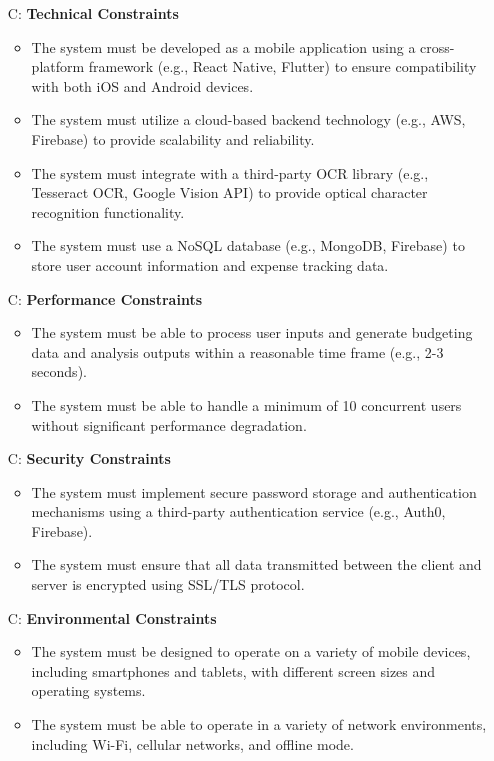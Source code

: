 \documentclass[12pt]{article}
\newcounter{constraintnum} %
\begin{document}
\begin{itemize}
  \item [C\refstepcounter{constraintnum}\theconstraintnum :] \textbf{Technical Constraints}
    \begin{itemize}
      \item The system must be developed as a mobile application using a cross-platform framework (e.g., React Native, Flutter) to ensure compatibility with both iOS and Android devices.
      \item The system must utilize a cloud-based backend technology (e.g., AWS, Firebase) to provide scalability and reliability.
      \item The system must integrate with a third-party OCR library (e.g., Tesseract OCR, Google Vision API) to provide optical character recognition functionality.
      \item The system must use a NoSQL database (e.g., MongoDB, Firebase) to store user account information and expense tracking data.
    \end{itemize}

  \item [C\refstepcounter{constraintnum}\theconstraintnum :] \textbf{Performance Constraints} 
    \begin{itemize}
      \item The system must be able to process user inputs and generate budgeting data and analysis outputs within a reasonable time frame (e.g., 2-3 seconds). 
      \item The system must be able to handle a minimum of 10 concurrent users without significant performance degradation. 
    \end{itemize}

  \item [C\refstepcounter{constraintnum}\theconstraintnum :] \textbf{Security Constraints} 
    \begin{itemize} 
      \item The system must implement secure password storage and authentication mechanisms using a third-party authentication service (e.g., Auth0, Firebase). 
      \item The system must ensure that all data transmitted between the client and server is encrypted using SSL/TLS protocol. 
    \end{itemize}
  
  \item [C\refstepcounter{constraintnum}\theconstraintnum :] \textbf{Environmental Constraints} 
    \begin{itemize} 
      \item The system must be designed to operate on a variety of mobile devices, including smartphones and tablets, with different screen sizes and operating systems. 
      \item The system must be able to operate in a variety of network environments, including Wi-Fi, cellular networks, and offline mode. 
    \end{itemize}
  

\end{itemize}
\end{document}
